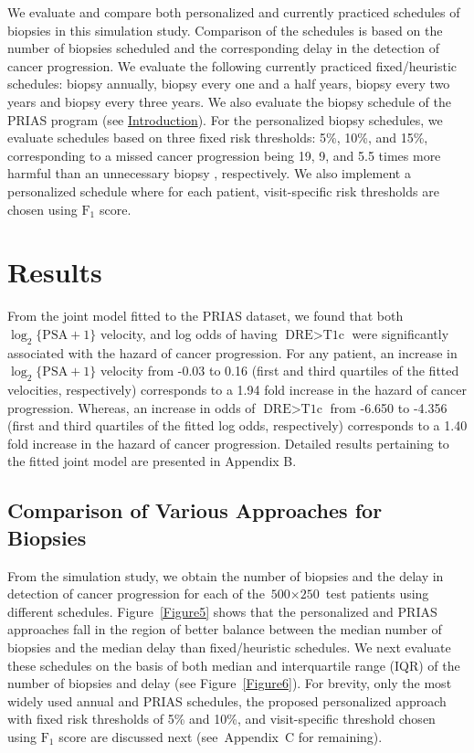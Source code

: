 \documentclass[a4paper, 12pt]{article}
\begin{document}
We evaluate and compare both personalized and currently practiced schedules of biopsies in this simulation study. Comparison of the schedules is based on the number of biopsies scheduled and the corresponding delay in the detection of cancer progression. We evaluate the following currently practiced fixed/heuristic schedules: biopsy annually, biopsy every one and a half years, biopsy every two years and biopsy every three years. We also evaluate the biopsy schedule of the PRIAS program (see \hyperref[sec:introduction]{Introduction}). For the personalized biopsy schedules, we evaluate schedules based on three fixed risk thresholds: 5\%, 10\%, and 15\%, corresponding to a missed cancer progression being 19, 9, and 5.5 times more harmful than an unnecessary biopsy \citep{vickers2006decision}, respectively. We also implement a personalized schedule where for each patient, visit-specific risk thresholds are chosen using $\mbox{F}_1$ score.

\section{Results}
\label{sec:results}
From the joint model fitted to the PRIAS dataset, we found that both $\log_2 \{\mbox{PSA} + 1\}$ velocity,  and log odds of having $\mbox{DRE} > \mbox{T1c}$  were significantly associated with the hazard of cancer progression. For any patient, an increase in $\log_2 \{\mbox{PSA} + 1\}$ velocity from -0.03 to 0.16 (first and third quartiles of the fitted velocities, respectively) corresponds to a 1.94 fold increase in the hazard of cancer progression. Whereas, an increase in odds of $\mbox{DRE} > \mbox{T1c}$ from -6.650 to -4.356 (first and third quartiles of the fitted log odds, respectively) corresponds to a 1.40 fold increase in the hazard of cancer progression. Detailed results pertaining to the fitted joint model are presented in Appendix B.

\subsection{Comparison of Various Approaches for Biopsies}
From the simulation study, we obtain the number of biopsies and the delay in detection of cancer progression for each of the ${\mbox{500} \times \mbox{250}}$ test patients using different schedules. Figure~\ref{Figure5} shows that the personalized and PRIAS approaches fall in the region of better balance between the median number of biopsies and the median delay than fixed/heuristic schedules. We next evaluate these schedules on the basis of both median and interquartile range (IQR) of the number of biopsies and delay (see Figure~\ref{Figure6}). For brevity, only the most widely used annual and PRIAS schedules, the proposed personalized approach with fixed risk thresholds of 5\% and 10\%, and visit-specific threshold chosen using $\mbox{F}_1$ score are discussed next (see~Appendix~C for remaining).
\end{document}

